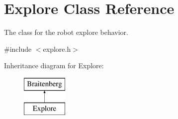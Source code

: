 \hypertarget{class_explore}{}\section{Explore Class Reference}
\label{class_explore}


The class for the robot explore behavior.  




{\ttfamily \#include $<$explore.\+h$>$}

Inheritance diagram for Explore\+:\begin{figure}[H]
\begin{center}
\leavevmode
\includegraphics[height=2.000000cm]{class_explore}
\end{center}
\end{figure}
